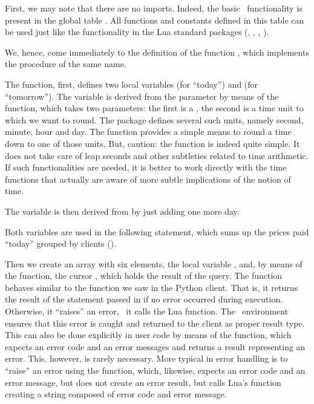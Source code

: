First, we may note that there are no imports.
Indeed, the basic \nowdb\ functionality is
present in the global table .
All functions and constants defined in
this table can be used just like the functionality
in the Lua standard packages (,
, , \etc).

We, hence, come immediately to the definition
of the function , which implements
the procedure of the same name.

The function, first, defines two local variables
 (for ``today'') and  (for ``tomorrow'').
The variable  is derived from the parameter
by means of the  function, which
takes two parameters: the first is a ,
the second is a time unit to which we want to round.
The  package defines several such units,
namely second, minute, hour and day.
The  function provides a simple means
to round a time down to one of those units.
But, caution: the function is indeed quite simple.
It does not take care of leap seconds and other
subtleties related to time arithmetic. If such
functionalities are needed, it is better to work
directly with the  time functions
that actually are aware of more subtle implications
of the notion of time.

The variable  is then derived from 
by just adding one more day.

Both variables are used in the following
 statement, which sums up the prices
paid ``today'' grouped by clients ().

Then we create an array with six elements, the local
variable , and, by means of the 
function, the cursor , which holds the result
of the query.
The function  behaves similar to
the  function we saw in the Python client.
That is, it returns the result of the statement passed in
if no error occurred during execution.
Otherwise, it ``raises'' an error, \ie\ it calls the Lua
 function.
The \nowdb\ environment ensures that this error is
caught and returned to the client as proper result type.
This can also be done explicitly in user code by means
of the  function, which expects an
error code and an error messages and returns a result
representing an error. This, however, is rarely necessary.
More typical in error handling is to ``raise'' an error
using the  function, which, likewise,
expects an error code and an error message, but does
not create an error result, but calls Lua's
 function creating a string composed
of error code and error message.

